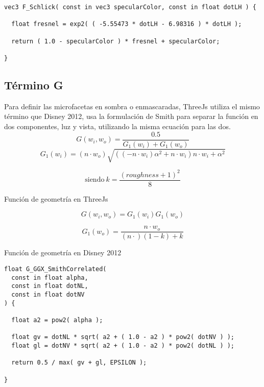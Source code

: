   \begin{lstlisting}[caption=Implementaci\'on en ThreeJs de la aproximaci\'on a la funci\'on de Fresnel]
vec3 F_Schlick( const in vec3 specularColor, const in float dotLH ) {

  float fresnel = exp2( ( -5.55473 * dotLH - 6.98316 ) * dotLH );

  return ( 1.0 - specularColor ) * fresnel + specularColor;

}
  \end{lstlisting}

  \subsection*{T\'ermino G}
  Para definir las microfacetas en sombra o enmascaradas, ThreeJs utiliza el mismo t\'ermino que Disney 2012, usa
  la formulaci\'on de Smith para separar la funci\'on en dos componentes, luz y vista, utilizando la misma ecuaci\'on
  para las dos.\\

  $$
  G(w_i, w_o) = \frac{0.5}{G_1(w_i) + G_1(w_o)}
  $$
  \singlespacing
  $$
  G_1(w_i) = (n \cdot{w_o}) \sqrt{((-n\cdot{w_i}) \alpha^2 + n\cdot{w_i}) n\cdot{w_i} + \alpha^2}
  $$
  \begin{eqfloat}[!htb]
    \begin{equation}
      \textrm{siendo}\ k = \frac{(roughness + 1)^2}{8}
    \end{equation}
  \caption{Funci\'on de geometr\'ia en ThreeJs}
  \end{eqfloat}
  \singlespacing

  $$
  G(w_i, w_o) = G_1(w_i)G_1(w_o)
  $$

  \begin{eqfloat}[!htb]
    \begin{equation}
      G_1(w_o) = \frac{n\cdot{w_o}}{(n\cdot) (1 - k) + k}
    \end{equation}
  \caption{Funci\'on de geometr\'ia en Disney 2012}
  \end{eqfloat}
  \singlespacing

\begin{lstlisting}[caption=Clase MeshClothMaterial]
float G_GGX_SmithCorrelated(
  const in float alpha,
  const in float dotNL,
  const in float dotNV
) {

  float a2 = pow2( alpha );

  float gv = dotNL * sqrt( a2 + ( 1.0 - a2 ) * pow2( dotNV ) );
  float gl = dotNV * sqrt( a2 + ( 1.0 - a2 ) * pow2( dotNL ) );

  return 0.5 / max( gv + gl, EPSILON );

}
\end{lstlisting}

